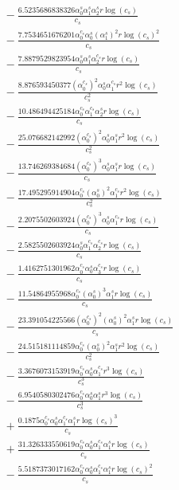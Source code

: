 \documentclass[10pt]{article}
\begin{document}
\begin{align*}
&{}  - \frac{6.5235686838326 \alpha_{0}^s \alpha_{1}^s \alpha_{2}^s r \log{\left(c_{s} \right)}}{c_{s}} \\
&{}  - \frac{7.7534651676201 \alpha_{0}^{c_s} \alpha_{0}^s \left(\alpha_{1}^s\right)^{2} r \log{\left(c_{s} \right)}^{2}}{c_{s}} \\
&{}  - \frac{7.8879529823954 \alpha_{0}^s \alpha_{1}^s \alpha_{2}^{c_s} r \log{\left(c_{s} \right)}}{c_{s}} \\
&{}  - \frac{8.876593450377 \left(\alpha_{0}^{c_s}\right)^{2} \alpha_{0}^s \alpha_{1}^{c_s} r^{2} \log{\left(c_{s} \right)}}{c_{s}^{2}} \\
&{}  - \frac{10.486494425184 \alpha_{0}^{c_s} \alpha_{1}^{c_s} \alpha_{2}^s r \log{\left(c_{s} \right)}}{c_{s}} \\
&{}  - \frac{25.076682142992 \left(\alpha_{0}^{c_s}\right)^{2} \alpha_{0}^s \alpha_{1}^s r^{2} \log{\left(c_{s} \right)}}{c_{s}^{2}} \\
&{}  - \frac{13.746269384684 \left(\alpha_{0}^{c_s}\right)^{3} \alpha_{0}^s \alpha_{1}^s r \log{\left(c_{s} \right)}}{c_{s}} \\
&{}  - \frac{17.495295914904 \alpha_{0}^{c_s} \left(\alpha_{0}^s\right)^{2} \alpha_{1}^{c_s} r^{2} \log{\left(c_{s} \right)}}{c_{s}^{2}} \\
&{}  - \frac{2.2075502603924 \left(\alpha_{0}^{c_s}\right)^{3} \alpha_{0}^s \alpha_{1}^{c_s} r \log{\left(c_{s} \right)}}{c_{s}} \\
&{}  - \frac{2.5825502603924 \alpha_{0}^s \alpha_{1}^{c_s} \alpha_{2}^{c_s} r \log{\left(c_{s} \right)}}{c_{s}} \\
&{}  - \frac{1.4162751301962 \alpha_{0}^{c_s} \alpha_{0}^s \alpha_{3}^{c_s} r \log{\left(c_{s} \right)}}{c_{s}} \\
&{}  - \frac{11.54864955968 \alpha_{0}^{c_s} \left(\alpha_{0}^s\right)^{3} \alpha_{1}^s r \log{\left(c_{s} \right)}}{c_{s}} \\
&{}  - \frac{23.391054225566 \left(\alpha_{0}^{c_s}\right)^{2} \left(\alpha_{0}^s\right)^{2} \alpha_{1}^s r \log{\left(c_{s} \right)}}{c_{s}} \\
&{}  - \frac{24.515181114859 \alpha_{0}^{c_s} \left(\alpha_{0}^s\right)^{2} \alpha_{1}^s r^{2} \log{\left(c_{s} \right)}}{c_{s}^{2}} \\
&{}  - \frac{3.3676073153919 \alpha_{0}^{c_s} \alpha_{0}^s \alpha_{1}^{c_s} r^{3} \log{\left(c_{s} \right)}}{c_{s}^{3}} \\
&{}  - \frac{6.9540580302476 \alpha_{0}^{c_s} \alpha_{0}^s \alpha_{1}^s r^{3} \log{\left(c_{s} \right)}}{c_{s}^{3}} \\
&{}  + \frac{0.1875 \alpha_{0}^{c_s} \alpha_{0}^s \alpha_{1}^{c_s} \alpha_{1}^s r \log{\left(c_{s} \right)}^{3}}{c_{s}} \\
&{}  + \frac{31.326333550619 \alpha_{0}^{c_s} \alpha_{0}^s \alpha_{1}^{c_s} \alpha_{1}^s r \log{\left(c_{s} \right)}}{c_{s}} \\
&{}  - \frac{5.5187373017162 \alpha_{0}^{c_s} \alpha_{0}^s \alpha_{1}^{c_s} \alpha_{1}^s r \log{\left(c_{s} \right)}^{2}}{c_{s}}
\end{align*}
\end{document}
